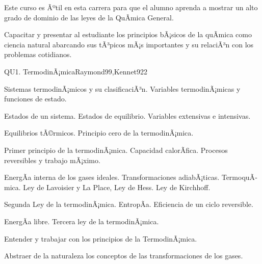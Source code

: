 \begin{syllabus}


\begin{justification}
Este curso es Ãºtil en esta carrera para que el alumno aprenda a mostrar un alto grado de dominio de las leyes de la QuÃ­mica General.
\end{justification}

\begin{goals}
\item Capacitar y presentar al estudiante los principios bÃ¡sicos de la quÃ­mica como ciencia natural abarcando sus tÃ³picos mÃ¡s importantes y su relaciÃ³n con los problemas cotidianos.
\end{goals}

\begin{outcomes}
\end{outcomes}

\begin{unit}{QU1. TermodinÃ¡mica}{Raymond99,Kennet92}{2}
\begin{topics}
      \item Sistemas termodinÃ¡micos y su clasificaciÃ³n. Variables termodinÃ¡micas y funciones de estado.
      \item Estados de un sistema. Estados de equilibrio. Variables extensivas e intensivas.
      \item Equilibrios tÃ©rmicos. Principio cero de la termodinÃ¡mica.
      \item Primer principio de la termodinÃ¡mica. Capacidad calorÃ­fica. Procesos reversibles y trabajo mÃ¡ximo.
      \item EnergÃ­a interna de los gases ideales. Transformaciones adiabÃ¡ticas. TermoquÃ­mica. Ley de Lavoisier y La Place, Ley de Hess. Ley de Kirchhoff.
      \item Segunda Ley de la termodinÃ¡mica. EntropÃ­a. Eficiencia de un ciclo reversible.
	\item EnergÃ­a libre. Tercera ley de la termodinÃ¡mica.
   \end{topics}

   \begin{unitgoals}
      \item Entender y trabajar con los principios de la TermodinÃ¡mica.
      \item Abstraer de la naturaleza los conceptos de las transformaciones de los gases.
   \end{unitgoals}
\end{unit}


\end{syllabus}
